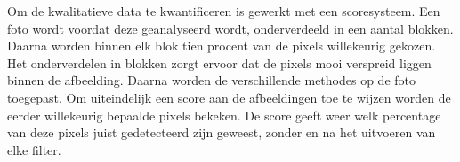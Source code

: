 Om de kwalitatieve data te kwantificeren is gewerkt met een scoresysteem. Een foto wordt voordat deze geanalyseerd wordt, onderverdeeld in een aantal blokken. Daarna worden binnen elk blok tien procent van de pixels willekeurig gekozen. Het onderverdelen in blokken zorgt ervoor dat de pixels mooi verspreid liggen binnen de afbeelding. Daarna worden de verschillende methodes op de foto toegepast. Om uiteindelijk een score aan de afbeeldingen toe te wijzen worden de eerder willekeurig bepaalde pixels bekeken. De score geeft weer welk percentage van deze pixels juist gedetecteerd zijn geweest, zonder en na het uitvoeren van elke filter.